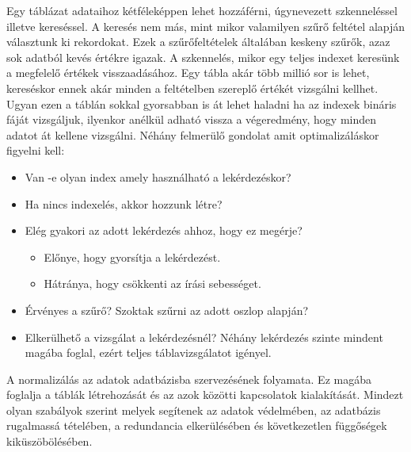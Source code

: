 

Egy táblázat adataihoz kétféleképpen lehet hozzáférni, úgynevezett szkenneléssel illetve kereséssel. A keresés nem más, mint mikor valamilyen szűrő feltétel alapján választunk ki rekordokat. Ezek a szűrőfeltételek általában keskeny szűrők, azaz sok adatból kevés értékre igazak. A szkennelés, mikor egy teljes indexet keresünk a megfelelő értékek visszaadásához. Egy tábla akár több millió sor is lehet, kereséskor ennek akár minden a feltételben szereplő értékét vizsgálni kellhet. Ugyan ezen a táblán sokkal gyorsabban is át lehet haladni ha az indexek bináris fáját vizsgáljuk, ilyenkor anélkül adható vissza a végeredmény, hogy minden adatot át kellene vizsgálni.
Néhány felmerülő gondolat amit optimalizáláskor figyelni kell:
\begin{itemize}
\item Van -e olyan index amely használható a lekérdezéskor?
\item Ha nincs indexelés, akkor hozzunk létre?
\item Elég gyakori az adott lekérdezés ahhoz, hogy ez megérje?
\begin{itemize}
\item Előnye, hogy gyorsítja a lekérdezést.
\item Hátránya, hogy csökkenti az írási sebességet.
\end{itemize}
\item Érvényes a szűrő? Szoktak szűrni az adott oszlop alapján?
\item Elkerülhető a vizsgálat a lekérdezésnél? Néhány lekérdezés szinte mindent magába foglal, ezért teljes táblavizsgálatot igényel.
\end{itemize}






A normalizálás az adatok adatbázisba szervezésének folyamata. Ez magába foglalja a táblák létrehozását és az azok közötti kapcsolatok kialakítását. Mindezt olyan szabályok szerint melyek segítenek az adatok védelmében, az adatbázis rugalmassá tételében, a redundancia elkerülésében és következetlen függőségek kiküszöbölésében.

